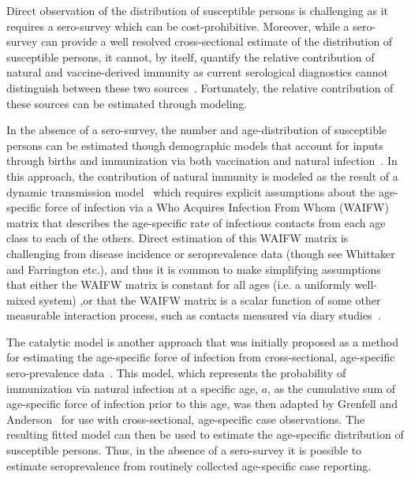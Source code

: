 \documentclass[nofootinbib,aps,pre,twocolumn,superscriptaddress,showkeys,showpacs]{revtex4-1}
\begin{document}
Direct observation of the distribution of susceptible persons is challenging as it requires a sero-survey which can be cost-prohibitive. 
Moreover, while a sero-survey can provide a well resolved cross-sectional estimate of the distribution of susceptible persons, it cannot, by itself, quantify the relative contribution of natural and vaccine-derived immunity as current serological diagnostics cannot distinguish between these two sources~\cite{Winter2018Sero}. Fortunately, the relative contribution of these sources can be estimated through modeling. 

In the absence of a sero-survey, the number and age-distribution of susceptible persons can be estimated though demographic models that account for inputs through births and immunization via both vaccination and natural infection~\cite{METCALF2017S14,TRENTINI20171089,Winter2018Sero}. In this approach, the contribution of natural immunity is modeled as the result of a dynamic transmission model~\cite{Metcalf2012} which requires explicit assumptions about the age-specific force of infection via a Who Acquires Infection From Whom (WAIFW) matrix that describes the age-specific rate of infectious contacts from each age class to each of the others.  Direct estimation of this WAIFW matrix is challenging from disease incidence or seroprevalence data (though see Whittaker and Farrington etc.), and thus it is common to make simplifying assumptions that either the WAIFW matrix is constant for all ages (i.e. a uniformly well-mixed system) ,or that the WAIFW matrix is a scalar function of some other measurable interaction process, such as contacts measured via diary studies~\cite{Polymod}.

The catalytic model is another approach that was initially proposed as a method for estimating the age-specific force of infection from cross-sectional, age-specific sero-prevalence data~\cite{griffiths_catalytic_1974}. 
This model, which represents the probability of immunization via natural infection at a specific age, $a$, as the cumulative sum of age-specific force of infection prior to this age, was then adapted by Grenfell and Anderson~\cite{Grenfell1985} for use with cross-sectional, age-specific case observations.  
The resulting fitted model can then be used to estimate the age-specific distribution of susceptible persons.
Thus, in the absence of a sero-survey it is possible to estimate seroprevalence from routinely collected age-specific case reporting.
\end{document}
